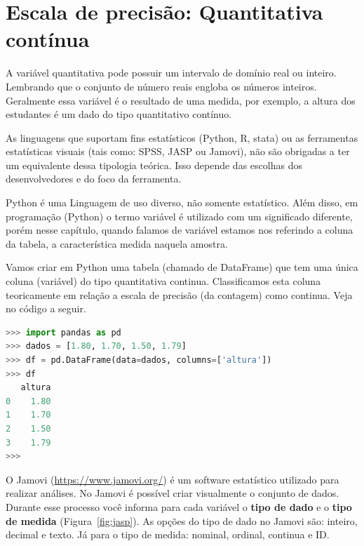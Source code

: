 \documentclass[a4paper,12pt]{book}
\begin{document}
\section{Escala de precisão: Quantitativa contínua}

A  variável quantitativa pode possuir um intervalo de domínio real ou inteiro. Lembrando que o conjunto de número reais engloba os números inteiros. Geralmente essa variável é o resultado de uma medida, por exemplo, a altura dos estudantes é um dado do tipo quantitativo contínuo.

As linguagens que suportam fins estatísticos (Python, R, stata) ou as ferramentas estatísticas visuais (tais como: SPSS, JASP ou Jamovi), não são obrigadas a ter um equivalente dessa tipologia teórica. Isso depende das escolhas dos desenvolvedores e do foco da ferramenta.

Python é uma Linguagem de uso diverso, não somente estatístico. Além disso, em programação (Python) o termo variável é utilizado com um significado diferente, porém nesse capítulo, quando falamos de variável estamos nos referindo a coluna da tabela, a característica medida naquela amostra.

Vamos criar em Python uma tabela (chamado de DataFrame) que tem uma única coluna (variável) do tipo quantitativa continua. Classificamos esta coluna teoricamente em relação a escala de precisão (da contagem) como continua. Veja no código a seguir.

\begin{lstlisting}[language=Python, caption={Código que cria e exibe uma tabela em Python com uma coluna. A classificação teórica dessa variável é quantitativa continua.}]
>>> import pandas as pd
>>> dados = [1.80, 1.70, 1.50, 1.79]
>>> df = pd.DataFrame(data=dados, columns=['altura'])
>>> df
   altura
0    1.80
1    1.70
2    1.50
3    1.79
>>>
\end{lstlisting}

O Jamovi (\url{https://www.jamovi.org/}) é um software estatístico utilizado para realizar análises. No Jamovi é possível criar visualmente o conjunto de dados. Durante esse processo você informa para cada variável o \textbf{tipo de dado} e o \textbf{tipo de medida} (Figura~\ref{fig:jasp}). As opções do tipo de dado no Jamovi são: inteiro, decimal e texto. Já para o tipo de medida: nominal, ordinal, continua e ID.
\end{document}
